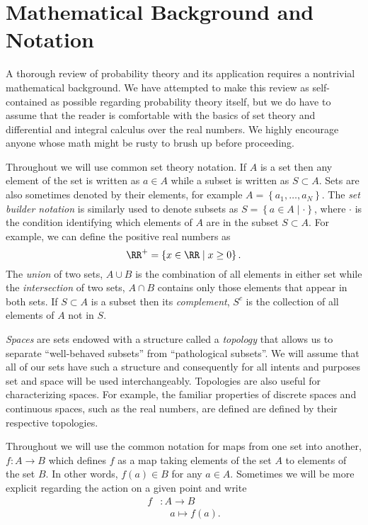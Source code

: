 \section{Mathematical Background and Notation}

A thorough review of probability theory and its application requires a nontrivial
mathematical background.  We have attempted to make this review as
self-contained as possible regarding probability theory itself, but we do have to
assume that the reader is comfortable with the basics of set theory and differential
and integral calculus over the real numbers.  We highly encourage anyone whose
math might be rusty to brush up before proceeding.

Throughout we will use common set theory notation.  If $A$ is a set
then any element of the set is written as $a \in A$ while a subset is written
as $S \subset A$.  Sets are also sometimes denoted by their elements, for
example $A = \left\{ a_{1}, \ldots, a_{N} \right\}$.  The \emph{set builder
notation} is similarly used to denote subsets as
$S = \left\{ a \in A \mid \cdot \right\}$, where $\cdot$ is the condition identifying
which elements of $A$ are in the subset $S \subset A$.  For example, we
can define the positive real numbers as
%
\begin{equation*}
\RR^{+} = \left\{ x \in \RR \mid x \ge 0 \right\}.
\end{equation*}
%
The \emph{union} of two sets, $A \cup B$ is the combination of all
elements in either set while the \emph{intersection} of two sets,
$A \cap B$ contains only those elements that appear in both sets.
If $S \subset A$ is a subset then its \emph{complement}, $S^{c}$ is
the collection of all elements of $A$ not in $S$.

\emph{Spaces} are sets endowed with a structure called a
\emph{topology} that allows us to separate ``well-behaved subsets''
from ``pathological subsets''.  We will assume that all of our sets
have such a structure and consequently for all intents and purposes
set and space will be used interchangeably.  Topologies are also
useful for characterizing spaces.  For example, the familiar properties
of discrete spaces and continuous spaces, such as the real numbers,
are defined are defined by their respective topologies.

Throughout we will use the common notation for maps from one set into
another, $f : A \rightarrow B$ which defines $f$ as a map taking elements
of the set $A$ to elements of the set $B$. In other words, $f(a) \in B$ for
any $a \in A$.  Sometimes we will be more explicit regarding the action
on a given point and write
%
\begin{align*}
f &: A \rightarrow B \\
  &\quad a \mapsto f \! \left( a \right).
\end{align*}

